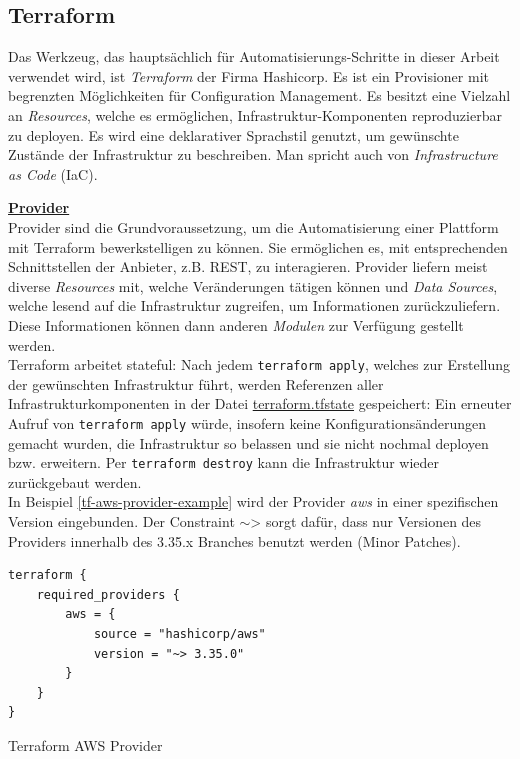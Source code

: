 \subsection{Terraform}
Das Werkzeug, das hauptsächlich für Automatisierungs-Schritte in dieser Arbeit verwendet wird, ist \textit{Terraform} der Firma Hashicorp. Es ist ein Provisioner mit begrenzten Möglichkeiten für Configuration Management. Es besitzt eine Vielzahl an \textit{Resources}, welche es ermöglichen, Infrastruktur-Komponenten  reproduzierbar  zu  deployen. Es wird eine deklarativer Sprachstil genutzt, um gewünschte Zustände der Infrastruktur zu beschreiben. Man spricht auch von \textit{Infrastructure as Code} (IaC).

\textbf{\underline{Provider}}\\
Provider sind die Grundvoraussetzung, um die Automatisierung einer Plattform mit Terraform bewerkstelligen zu können. Sie ermöglichen es, mit entsprechenden Schnittstellen der Anbieter, z.B. REST, zu interagieren. Provider liefern meist diverse \textit{Resources} mit, welche Veränderungen tätigen können und \textit{Data Sources}, welche \glqq lesend\grqq{} auf die Infrastruktur zugreifen, um Informationen zurückzuliefern. Diese Informationen können dann anderen \textit{Modulen} zur Verfügung gestellt werden.\cite{Brikman2019}\\
Terraform arbeitet stateful: Nach jedem \texttt{terraform apply}, welches zur Erstellung der gewünschten Infrastruktur führt, werden Referenzen aller Infrastrukturkomponenten in der Datei \underline{terraform.tfstate} gespeichert: Ein erneuter Aufruf von \texttt{terraform apply} würde, insofern keine Konfigurationsänderungen gemacht wurden, die Infrastruktur so belassen und sie nicht nochmal deployen bzw. erweitern. Per \texttt{terraform destroy} kann die Infrastruktur wieder zurückgebaut werden.\\
In Beispiel \ref{tf-aws-provider-example} wird der Provider \textit{aws} in einer spezifischen Version eingebunden. Der Constraint \glqq $\sim$>\grqq{} sorgt dafür, dass nur Versionen des Providers innerhalb des 3.35.x Branches benutzt werden (\glqq Minor Patches\grqq{}).
\begin{listing}[h]
\begin{verbatim}
terraform {
    required_providers {
        aws = {
            source = "hashicorp/aws"
            version = "~> 3.35.0"
        }
    }
}
\end{verbatim}
\caption{Terraform AWS Provider}
\label{tf-aws-provider-example}
\end{listing}
